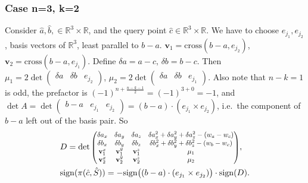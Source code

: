\documentclass[12pt]{article}
\theoremstyle{definition}
\theoremstyle{remark}
\begin{document}
\subsubsection*{Case n=3, k=2}
Consider $\hat a, \hat b,  \in \mathbb{R}^3 \times \mathbb{R}$, and the query point $\hat c \in \mathbb{R}^3 \times \mathbb{R}$. We have to choose $e_{j_1}, e_{j_2}$, basis vectors of $\mathbb{R}^3$, least parallel to $b-a$. $\mathbf{v}_1 = \mathrm{cross}(b-a, e_{j_2})$, $\mathbf{v}_2 = \mathrm{cross}(b-a, e_{j_1})$. Define $\delta a = a -c, \, \delta b = b-c$. Then $\mu_1 = 2\det \left( 
\begin{array}{c|c|c}
    \delta a & \delta b & e_{j_2}
\end{array}\right)$, $\mu_2 = 2\det \left( 
\begin{array}{c|c|c}
    \delta a & \delta b & e_{j_1}
\end{array}\right)$. Also note that $n-k = 1$ is odd, the prefactor is
$(-1)^{n+\frac{n-k-1}{2}} = (-1)^{3+0} = -1$, and
$\det A = \det \left( \begin{array}{c|c|c} b-a & e_{j_1} & e_{j_2} \end{array} \right)
= (b-a)\cdot(e_{j_1} \times e_{j_2})$,
i.e.\ the component of $b-a$ left out of the basis pair. So
\begin{align*}
    &D = \det 
    \scalebox{0.82}{$\begin{pmatrix} 
            \delta a_x & \delta a_y & \delta a_z & \delta a_x^2+ \delta a_y^2 + \delta a_z^2 - (w_a - w_c) \\
            \delta b_x & \delta b_y & \delta b_z & \delta b_x^2+ \delta b_y^2 + \delta b_z^2 - (w_b - w_c) \\
            \mathbf{v}_1^x & \mathbf{v}_1^y & \mathbf{v}_1^z & \mu_1 \\
            \mathbf{v}_2^x & \mathbf{v}_2^y & \mathbf{v}_2^z & \mu_2 \\
\end{pmatrix}$}, \\
&\mathrm{sign}(\pi(\hat c, \hat S)) =  -\mathrm{sign}\big((b-a)\cdot(e_{j_1} \times e_{j_2})\big) \cdot \mathrm{sign}(D).
\end{align*}
\end{document}
